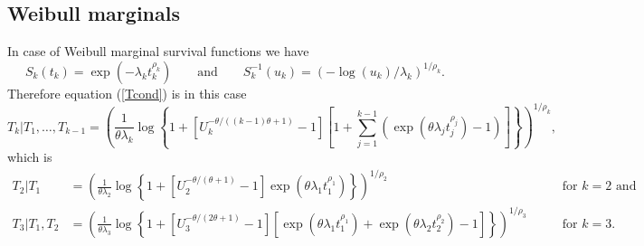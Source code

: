 \documentclass[a4paper,10pt]{article}
\begin{document}
\subsection*{Weibull marginals}
  In case of Weibull marginal survival functions we have 
  \[ 
    S_k(t_k) = \exp(-\lambda_k t_k^{\rho_k})
    \qquad \text{and} \qquad 
    S_k^{-1}(u_k) = \left( -\log(u_k)/\lambda_k \right)^{1/\rho_k}.
  \]
  Therefore equation (\ref{Tcond}) is in this case
  \begin{equation*}
    T_k|T_1,\ldots,T_{k-1} = \left(
      \frac1{\theta\lambda_k}\log\left\{ 1+
        \left[ U_k^{-\theta/((k-1)\theta+1)}-1\right]
        \left[ 1+ \sum_{j=1}^{k-1} \left( \exp(\theta\lambda_j t_j^{\rho_j})-1 \right) \right]
      \right\}
    \right)^{1/\rho_k},
  \end{equation*}
  which is 
  \begin{align*}
    T_2|T_1 &= \left(
      \frac1{\theta\lambda_2}\log\left\{ 1+
        \left[ U_2^{-\theta/(\theta+1)}-1\right]
        \exp(\theta\lambda_1 t_1^{\rho_1})
      \right\}
    \right)^{1/\rho_2} &\qquad\text{for } k=2 \text{ and}\\
%     
    T_3|T_1,T_2 &=\left(
      \frac1{\theta\lambda_3}\log\left\{ 1+
        \left[ U_3^{-\theta/(2\theta+1)}-1\right]
        \left[ \exp(\theta\lambda_1 t_1^{\rho_1}) +\exp(\theta\lambda_2 t_2^{\rho_2}) -1 \right]
      \right\}
    \right)^{1/\rho_3} &\qquad\text{for } k=3.
  \end{align*}
\end{document}
